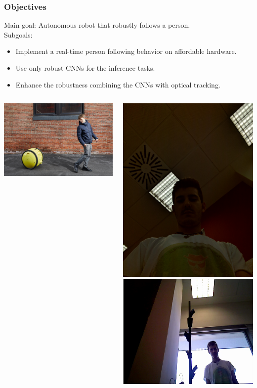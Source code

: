 \documentclass[11pt]{beamer}
\begin{document}
\begin{frame}
	\frametitle{Objectives}
	Main goal: \alert{Autonomous robot that robustly follows a person.}\pause\\
	Subgoals:\\
	\vspace{0.2cm}
	\begin{itemize}
		\item Implement a real-time person following behavior on affordable hardware.
		\item Use only robust CNNs for the inference tasks.
		\item Enhance the robustness combining the CNNs with optical tracking.
	\end{itemize}
	\begin{columns}
			\begin{center}
				\includegraphics[width=0.9\linewidth]{robot_following} \\
			\end{center}
			\begin{center}
				\includegraphics[width=0.36\linewidth]{light_ko}
				\includegraphics[width=0.6\linewidth]{light_ko_2} \\

\end{center}
\end{columns}
\end{frame}
\end{document}
